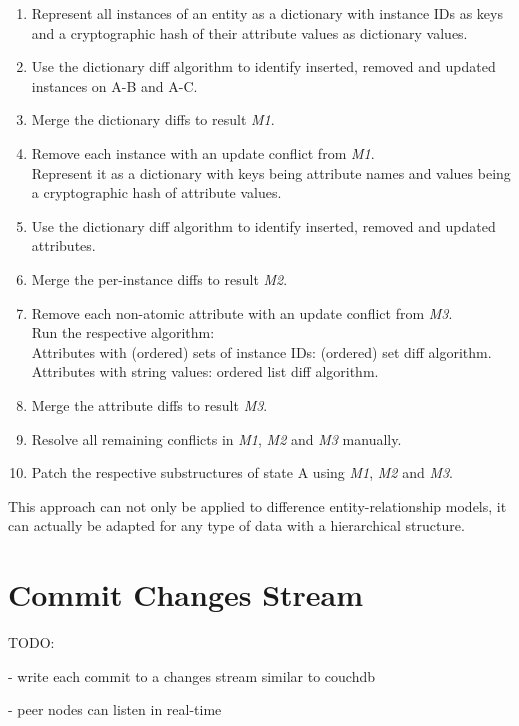 \begin{enumerate}
\item Represent all instances of an entity as a dictionary with instance IDs as keys and a cryptographic hash of their attribute values as dictionary values.
\item Use the dictionary diff algorithm to identify inserted, removed and updated instances on A-B and A-C.
\item Merge the dictionary diffs to result \emph{M1}.
\item Remove each instance with an update conflict from \emph{M1}.\\
Represent it as a dictionary with keys being attribute names and values being a cryptographic hash of attribute values.
\item Use the dictionary diff algorithm to identify inserted, removed and updated attributes.
\item Merge the per-instance diffs to result \emph{M2}.
\item Remove each non-atomic attribute with an update conflict from \emph{M3}.\\
Run the respective algorithm:\\
Attributes with (ordered) sets of instance IDs: (ordered) set diff algorithm.\\
Attributes with string values: ordered list diff algorithm.
\item Merge the attribute diffs to result \emph{M3}.
\item Resolve all remaining conflicts in \emph{M1}, \emph{M2} and \emph{M3} manually.
\item Patch the respective substructures of state A using \emph{M1}, \emph{M2} and \emph{M3}.
\end{enumerate}

This approach can not only be applied to difference entity-relationship models, it can actually be adapted for any type of data with a hierarchical structure.

\section{Commit Changes Stream}
\label{main.diff-across-commits}

TODO:

- write each commit to a changes stream similar to couchdb

- peer nodes can listen in real-time


